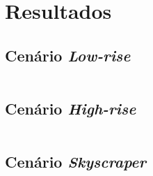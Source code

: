 \chapter{\label{chap:results}Resultados}

\section{Cenário \textit{Low-rise}}

\lipsum[1]

\inputminted{text}{results/low-rise.txt}

\section{Cenário \textit{High-rise}}

\lipsum[1]

\inputminted{text}{results/high-rise.txt}

\section{Cenário \textit{Skyscraper}}

\lipsum[1]

\inputminted{text}{results/skyscraper.txt}
